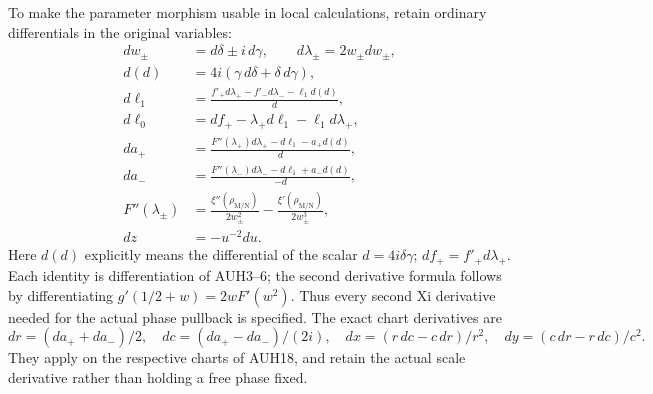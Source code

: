 To make the parameter morphism usable in local calculations, retain
ordinary differentials in the original variables:
\[
\begin{aligned}
 dw_\pm&=d\delta\pm i\,d\gamma,\qquad
 d\lambda_\pm=2w_\pm dw_\pm,\\
 d(d)&=4i(\gamma\,d\delta+\delta\,d\gamma),\\
 d\ell_1&=\frac{f'_+d\lambda_+-f'_-d\lambda_--\ell_1d(d)}{d},\\
 d\ell_0&=df_+-\lambda_+d\ell_1-\ell_1d\lambda_+,\\
 da_+&=\frac{F''(\lambda_+)d\lambda_+-d\ell_1-a_+d(d)}{d},\\
 da_-&=\frac{F''(\lambda_-)d\lambda_--d\ell_1+a_-d(d)}{-d},\\
 F''(\lambda_\pm)&=
   \frac{\xi''(\rho_{\mathrm M/\mathrm N})}{2w_\pm^2}
  -\frac{\xi'(\rho_{\mathrm M/\mathrm N})}{2w_\pm^3},\\
 dz&=-u^{-2}du.
\end{aligned}\tag{AUH27}
\]
Here $d(d)$ explicitly means the differential of the scalar
$d=4i\delta\gamma$; $df_+=f'_+d\lambda_+$.
Each identity is differentiation of AUH3--6; the second derivative
formula follows by differentiating $g'(1/2+w)=2wF'(w^2)$.
Thus every second Xi derivative needed for the actual phase
pullback is specified.  The exact chart derivatives are
\[
 dr=(da_++da_-)/2,\quad dc=(da_+-da_-)/(2i),\quad
 dx=(r\,dc-c\,dr)/r^2,\quad
 dy=(c\,dr-r\,dc)/c^2.
 \tag{AUH28}
\]
They apply on the respective charts of AUH18, and retain the
actual scale derivative rather than holding a free phase fixed.

